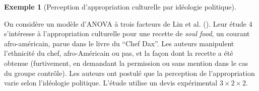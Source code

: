 \documentclass[
  11pt,
  letterpaper,
]{scrbook}
\theoremstyle{plain}
\theoremstyle{plain}
\theoremstyle{definition}
\newtheorem{example}{Exemple}[chapter]
\theoremstyle{definition}
\theoremstyle{remark}
\begin{document}
\begin{example}[Perception d'appropriation culturelle par idéologie
politique]\protect\hypertarget{exm-LKUK24}{}\label{exm-LKUK24}

On considère un modèle d'ANOVA à trois facteurs de Lin et al.
(). Leur étude 4
s'intéresse à l'appropriation culturelle pour une recette de \emph{soul
food}, un courant afro-américain, parue dans le livre du ``Chef Dax''.
Les auteurs manipulent l'ethnicité du chef, afro-Américain ou pas, et la
façon dont la recette a été obtenue (furtivement, en demandant la
permission ou sans mention dans le cas du groupe contrôle). Les auteurs
ont postulé que la perception de l'appropriation varie selon l'idéologie
politique. L'étude utilise un devis expérimental
\(3 \times 2 \times 2.\)


\end{example}
\end{document}
